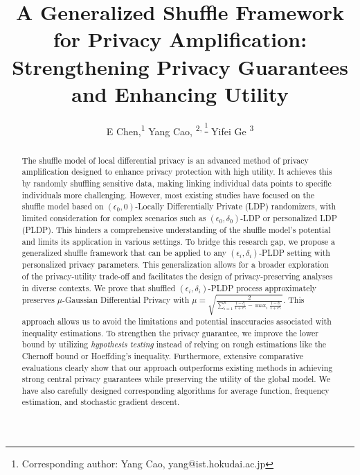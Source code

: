 \documentclass[letterpaper]{article} %
\title{A Generalized Shuffle Framework for Privacy Amplification: Strengthening Privacy Guarantees and Enhancing Utility}
\author {
    E Chen,\textsuperscript{\rm 1}
    Yang Cao, \textsuperscript{\rm 2, \thanks{Corresponding author: Yang Cao, yang@ist.hokudai.ac.jp }}
    Yifei Ge \textsuperscript{\rm 3}
}
\begin{document}
\maketitle

\begin{abstract}
The shuffle model of local differential privacy is an advanced method of privacy amplification designed to enhance privacy protection with high utility. 
It achieves this by randomly shuffling sensitive data, making linking individual data points to specific individuals more challenging.
However, most existing studies have focused on the shuffle model based on
$(\epsilon_0,0)$-Locally Differentially Private (LDP) randomizers, with limited consideration for complex scenarios such as $(\epsilon_0,\delta_0)$-LDP or personalized LDP (PLDP). 
This hinders a comprehensive understanding of the shuffle model's potential and limits its application in various settings.
To bridge this research gap, we propose a generalized shuffle framework that can be applied to any
$(\epsilon_i,\delta_i)$-PLDP setting with personalized privacy parameters. 
This generalization allows for a broader exploration of the privacy-utility trade-off and facilitates the design of privacy-preserving analyses in diverse contexts.
We prove that shuffled $(\epsilon_i,\delta_i)$-PLDP process approximately preserves $\mu$-Gaussian Differential Privacy with $
\mu = \sqrt{\frac{2}{\sum_{i=1}^{n} \frac{1-\delta_i}{1+e^{\epsilon_i}}-\max_{i}{\frac{1-\delta_{i}}{1+e^{\epsilon_{i}}}}}}.
$
This approach allows us to avoid the limitations and potential inaccuracies associated with inequality estimations.
To strengthen the privacy guarantee, we improve the lower bound by utilizing \textit{hypothesis testing} instead of relying on rough estimations like the Chernoff bound or Hoeffding's inequality.
Furthermore, extensive comparative evaluations clearly show that our approach outperforms existing methods in achieving strong central privacy guarantees while preserving the utility of the global model.
We have also carefully designed corresponding algorithms for average function, frequency estimation, and stochastic gradient descent.
\end{abstract}
\end{document}
